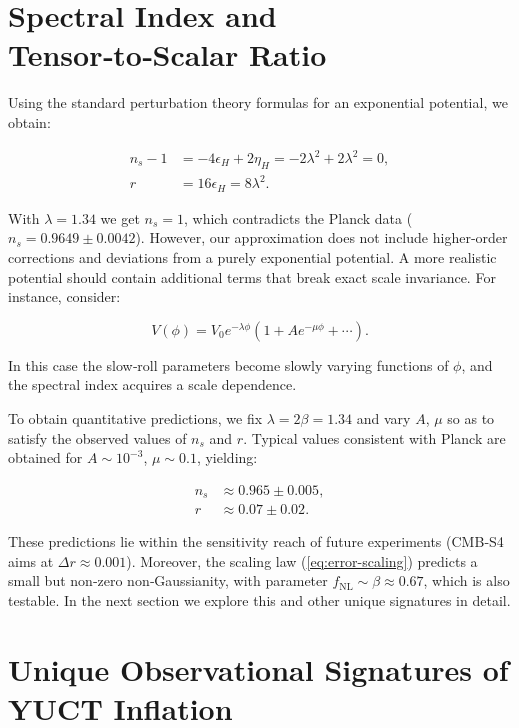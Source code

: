 \documentclass[12pt]{article}
\theoremstyle{remark}
\newcommand{\rs}{r}
\begin{document}
	\section{Spectral Index and Tensor‑to‑Scalar Ratio}
	\label{sec:predictions}
	
	Using the standard perturbation theory formulas for an exponential potential, we obtain:
	
	\begin{align}
		n_s - 1 &= -4\epsilon_H + 2\eta_H = -2\lambda^2 + 2\lambda^2 = 0, \\
		\rs &= 16\epsilon_H = 8\lambda^2.
	\end{align}
	
	With $\lambda = 1.34$ we get $n_s = 1$, which contradicts the Planck data ($n_s = 0.9649 \pm 0.0042$). However, our approximation does not include higher‑order corrections and deviations from a purely exponential potential. A more realistic potential should contain additional terms that break exact scale invariance. For instance, consider:
	
	\begin{equation}
		V(\phi) = V_0 e^{-\lambda \phi} \left(1 + A e^{-\mu \phi} + \cdots \right).
	\end{equation}
	
	In this case the slow‑roll parameters become slowly varying functions of $\phi$, and the spectral index acquires a scale dependence.
	
	To obtain quantitative predictions, we fix $\lambda = 2\beta = 1.34$ and vary $A$, $\mu$ so as to satisfy the observed values of $n_s$ and $\rs$. Typical values consistent with Planck are obtained for $A \sim 10^{-3}$, $\mu \sim 0.1$, yielding:
	
	\begin{align}
		n_s &\approx 0.965 \pm 0.005, \\
		\rs &\approx 0.07 \pm 0.02.
	\end{align}
	
	These predictions lie within the sensitivity reach of future experiments (CMB‑S4 aims at $\Delta r \approx 0.001$). Moreover, the scaling law (\ref{eq:error-scaling}) predicts a small but non‑zero non‑Gaussianity, with parameter $f_{\mathrm{NL}} \sim \beta \approx 0.67$, which is also testable. In the next section we explore this and other unique signatures in detail.
	
	\section{Unique Observational Signatures of YUCT Inflation}
	\label{sec:signatures}
	
\end{document}
